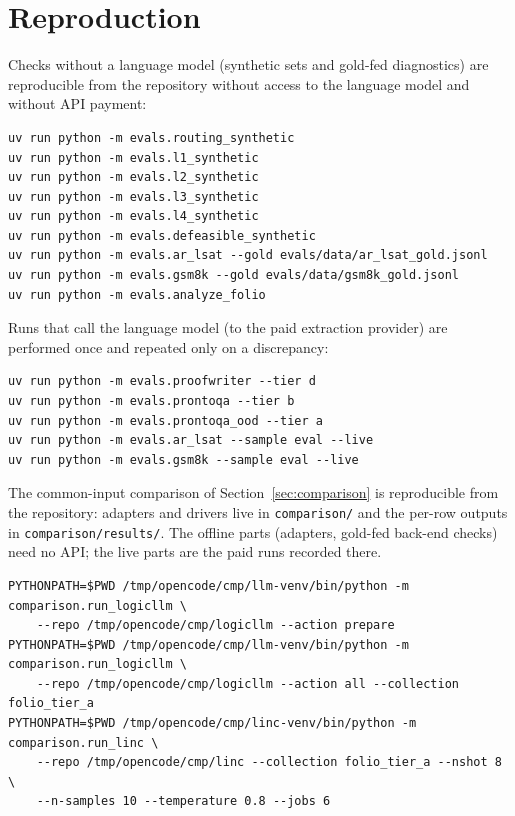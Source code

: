 \documentclass[11pt,a4paper]{article}
\begin{document}
\section{Reproduction}
\label{app:repro}

Checks without a language model (synthetic sets and gold-fed diagnostics) are reproducible
from the repository without access to the language model and without API payment:

\begin{verbatim}
uv run python -m evals.routing_synthetic
uv run python -m evals.l1_synthetic
uv run python -m evals.l2_synthetic
uv run python -m evals.l3_synthetic
uv run python -m evals.l4_synthetic
uv run python -m evals.defeasible_synthetic
uv run python -m evals.ar_lsat --gold evals/data/ar_lsat_gold.jsonl
uv run python -m evals.gsm8k --gold evals/data/gsm8k_gold.jsonl
uv run python -m evals.analyze_folio
\end{verbatim}

Runs that call the language model (to the paid extraction provider) are performed once and
repeated only on a discrepancy:

\begin{verbatim}
uv run python -m evals.proofwriter --tier d
uv run python -m evals.prontoqa --tier b
uv run python -m evals.prontoqa_ood --tier a
uv run python -m evals.ar_lsat --sample eval --live
uv run python -m evals.gsm8k --sample eval --live
\end{verbatim}

The common-input comparison of Section~\ref{sec:comparison} is reproducible from the
repository: adapters and drivers live in \texttt{comparison/} and the per-row outputs in
\texttt{comparison/results/}. The offline parts (adapters, gold-fed back-end checks) need no
API; the live parts are the paid runs recorded there.

\begin{verbatim}
PYTHONPATH=$PWD /tmp/opencode/cmp/llm-venv/bin/python -m comparison.run_logicllm \
    --repo /tmp/opencode/cmp/logicllm --action prepare
PYTHONPATH=$PWD /tmp/opencode/cmp/llm-venv/bin/python -m comparison.run_logicllm \
    --repo /tmp/opencode/cmp/logicllm --action all --collection folio_tier_a
PYTHONPATH=$PWD /tmp/opencode/cmp/linc-venv/bin/python -m comparison.run_linc \
    --repo /tmp/opencode/cmp/linc --collection folio_tier_a --nshot 8 \
    --n-samples 10 --temperature 0.8 --jobs 6
\end{verbatim}
\end{document}
